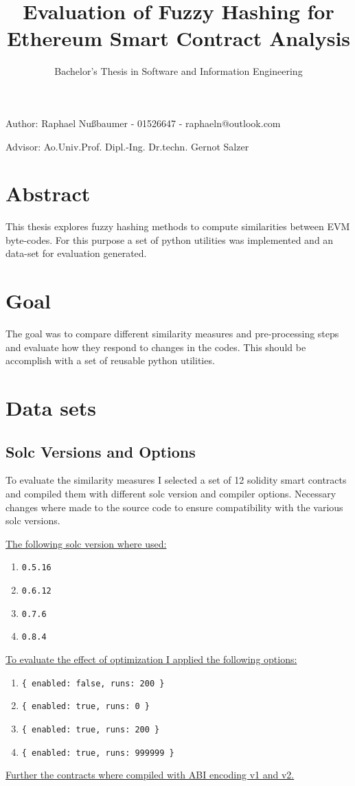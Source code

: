 \documentclass{article}
\title{Evaluation of Fuzzy Hashing for Ethereum Smart Contract Analysis}
\author{Bachelor's Thesis in Software and Information Engineering}
\date{}
\newcommand{\code}[1]{\mbox{\texttt{\footnotesize{#1}}}}
\newenvironment{ol}
{ \begin{enumerate}
  \setlength{\itemsep}{0pt}
  \setlength{\parskip}{0pt}
  \setlength{\parsep}{0pt}
}{ \end{enumerate} }
\begin{document}
\maketitle
Author: Raphael Nußbaumer - 01526647 - raphaeln@outlook.com

Advisor: Ao.Univ.Prof. Dipl.-Ing. Dr.techn. Gernot Salzer

\section{Abstract}
This thesis explores fuzzy hashing methods to compute similarities between EVM byte-codes.
For this purpose a set of python utilities was implemented and an data-set for evaluation generated.

\section{Goal}
The goal was to compare different similarity measures and pre-processing steps and evaluate how
they respond to changes in the codes.
This should be accomplish with a set of reusable python utilities.

\section{Data sets}
\subsection{Solc Versions and Options}
To evaluate the similarity measures I selected a set of 12 solidity smart contracts and compiled
them with different solc version and compiler options.
Necessary changes where made to the source code to ensure compatibility with the various solc
versions.

\underline{The following solc version where used:}
\begin{ol}
  \item \code{0.5.16}
  \item \code{0.6.12}
  \item \code{0.7.6}
  \item \code{0.8.4}
\end{ol}
\underline{To evaluate the effect of optimization I applied the following options:}
\begin{ol}
  \item \code{\{ enabled: false, runs: 200 \}}
  \item \code{\{ enabled: true, runs: 0 \}}
  \item \code{\{ enabled: true, runs: 200 \}}
  \item \code{\{ enabled: true, runs: 999999 \}}
\end{ol}
\underline{Further the contracts where compiled with ABI encoding v1 and v2.}
\end{document}
